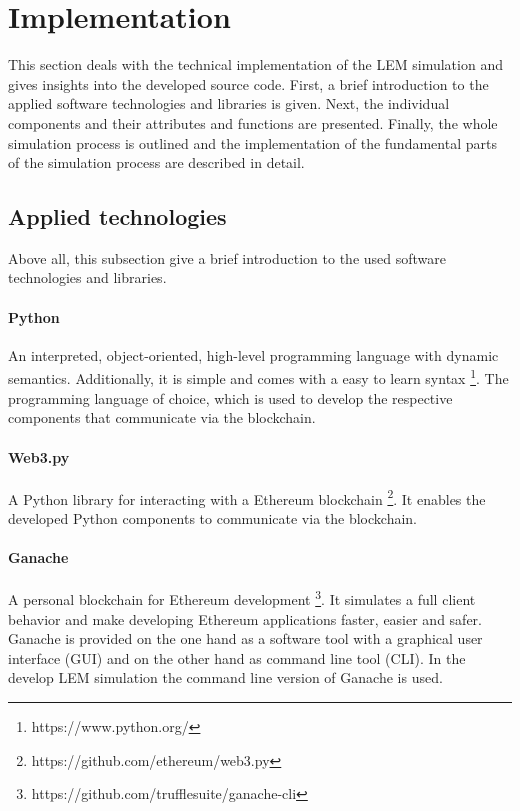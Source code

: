 \section{Implementation}
\label{sec:implementation}

This section deals with the technical implementation of the LEM simulation
and gives insights into the developed source code.
First, a brief introduction to the applied software 
technologies and libraries is given.
Next, the individual components and their attributes and functions are presented. 
Finally, the whole simulation process is outlined and the 
implementation of the fundamental parts 
of the simulation process are described in detail. 

\subsection{Applied technologies}
\label{sec:applied_technologies}
Above all, this subsection give a brief introduction to the used software technologies and libraries.

\paragraph{Python}
An interpreted, object-oriented, high-level programming 
language with dynamic semantics. Additionally, it is simple and 
comes with a easy to learn syntax \footnote{https://www.python.org/}.
The programming language of choice, which is used to develop the 
respective components that communicate via the blockchain.

\paragraph{Web3.py}
A Python library for interacting with a Ethereum blockchain \footnote{https://github.com/ethereum/web3.py}. 
It enables the developed Python components to communicate via the blockchain.

\paragraph{Ganache}
A personal blockchain for Ethereum development \footnote{https://github.com/trufflesuite/ganache-cli}.
It simulates a full client behavior and make developing Ethereum applications faster, easier and safer.
Ganache is provided on the one hand as a software tool with a graphical user interface (GUI) and 
on the other hand as command line tool (CLI). In the develop LEM simulation the command line version 
of Ganache is used. 

